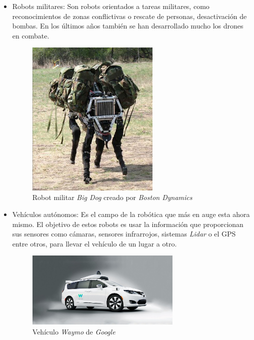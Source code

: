 \begin{itemize}
    \item Robots militares: Son robots orientados a tareas militares, como reconocimientos de zonas conflictivas o rescate de personas, desactivación de bombas. En los últimos años también se han desarrollado mucho los drones en combate.
      \begin{figure}[H]
    \centering
    \includegraphics[width=0.6\textwidth]{img/bigdog.jpg}
    \caption{Robot militar \textit{Big Dog} creado por \textit{Boston Dynamics}} \label{fig:bigdog}
    \end{figure}
    
    \item Vehículos autónomos: Es el campo de la robótica que más en auge esta ahora mismo. El objetivo de estos robots es usar la información que proporcionan sus sensores como cámaras, sensores infrarrojos, sistemas \textit{Lidar} o el GPS entre otros, para llevar el vehículo de un lugar a otro.

    \begin{figure}[H]
        \centering
        \includegraphics[width=0.7\textwidth]{img/waymo.jpg}
        \caption{Vehículo \textit{Waymo} de \textit{Google}} \label{fig:waymo}
    \end{figure}


\end{itemize}
